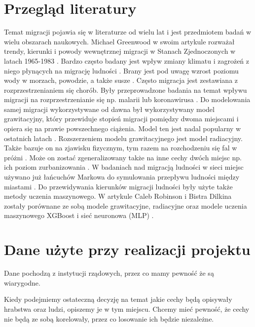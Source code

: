 \documentclass[a4paper,12pt]{article}
\begin{document}
\section*{Przegląd literatury}
Temat migracji pojawia się w literaturze od wielu lat i jest przedmiotem badań w wielu obszarach naukowych.  Michael Greenwood w swoim artykule rozważał trendy, kierunki i powody wewnętrznej migracji w Stanach Zjednoczonych w latach 1965-1983 \cite*{Greenwood1985HumanMT}. Bardzo często badany jest wpływ zmiany klimatu i zagrożeń z niego płynących na migrację ludności \cite{ijerph17176036}. Brany jest pod uwagę wzrost poziomu wody w morzach, powodzie, a także susze \cite{climatemigrate, DeLellis2021Modeling, Isaacman2018Modeling}. Często migracja jest zestawiana z rozprzestrzenianiem się chorób. Były przeprowadzone badania na temat wpływu migracji na rozprzestrzenianie się np. malarii lub koronawirusa \cite{Rejeki2018Time, covidmigrations}.
Do modelowania samej migracji wykorzystywane od dawna był wykorzystywany model grawitacyjny, który przewiduje stopień migracji pomiędzy dwoma miejscami i opiera się na prawie powszechnego ciążenia. Model ten jest nadal popularny w ostatnich latach \cite{grawitacja}.  Rozszerzeniem modelu grawitacyjnego jest model radiacyjny. Także bazuje on na zjawisku fizycznym, tym razem na rozchodzeniu się fal w próżni \cite{Simini2012Universal}. Może on zostać zgeneralizowany także na inne cechy dwóch miejsc  np. ich poziom zurbanizowania \cite{Alis2021Generalized}.  W badaniach nad migracją ludności w sieci miejsc używano już łańcuchów Markowa do symulowania przepływu ludności między miastami \cite{PAN199431}.  Do przewidywania kierunków migracji ludności były użyte także metody uczenia maszynowego. W artykule Caleb Robinson i Bistra Dilkina zostały porównane ze sobą modele grawitacyjne, radiacyjne oraz modele uczenia maszynowego XGBoost i sieć neuronowa (MLP) \cite{robinson2017machine}.



\section*{Dane użyte przy realizacji projektu}
Dane pochodzą z instytucji rządowych, przez co mamy pewność że są wiarygodne.

Kiedy podejmiemy ostateczną decyzję na temat jakie cechy będą opisywały hrabstwa oraz ludzi, opiszemy je w tym miejscu. Chcemy mieć pewność, że cechy nie będą ze sobą korelowały, przez co losowanie ich będzie niezależne.
\end{document}
